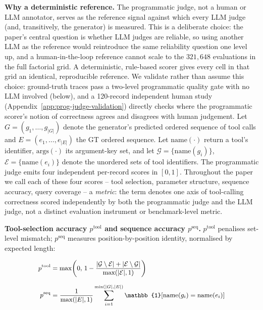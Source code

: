 \noindent\textbf{Why a deterministic reference.} The programmatic judge, not a human or LLM annotator, serves as the reference signal against which every LLM judge (and, transitively, the generator) is measured. This is a deliberate choice: the paper's central question is whether LLM judges are reliable, so using another LLM as the reference would reintroduce the same reliability question one level up, and a human-in-the-loop reference cannot scale to the $321{,}648$ evaluations in the full factorial grid. A deterministic, rule-based scorer gives every cell in that grid an identical, reproducible reference. We validate rather than assume this choice: ground-truth traces pass a two-level programmatic quality gate with no LLM involved (below), and a 120-record independent human study (Appendix~\ref{app:prog-judge-validation}) directly checks where the programmatic scorer's notion of correctness agrees and disagrees with human judgement. Let $G = (g_1, \dots, g_{|G|})$ denote the generator's predicted ordered sequence of tool calls and $E = (e_1, \dots, e_{|E|})$ the GT ordered sequence. Let $\mathrm{name}(\cdot)$ return a tool's identifier, $\mathrm{args}(\cdot)$ its argument-key set, and let $\mathcal{G} = \{\mathrm{name}(g_i)\}$, $\mathcal{E} = \{\mathrm{name}(e_i)\}$ denote the unordered sets of tool identifiers. The programmatic judge emits four independent per-record scores in $[0, 1]$. Throughout the paper we call each of these four scores -- tool selection, parameter structure, sequence accuracy, query coverage -- a \emph{metric}: the term denotes one axis of tool-calling correctness scored independently by both the programmatic judge and the LLM judge, not a distinct evaluation instrument or benchmark-level metric.

\textbf{Tool-selection accuracy $p^{\text{tool}}$ and sequence accuracy $p^{\text{seq}}$.}
$p^{\text{tool}}$ penalises set-level mismatch; $p^{\text{seq}}$ measures position-by-position identity, normalised by expected length:

\vspace{-0.4cm}
\begin{subequations}
\small
\begin{align}
p^{\text{tool}}
&=
\max\!\left(
0,\,
1
-
\frac{
|\mathcal{G} \setminus \mathcal{E}|
+
|\mathcal{E} \setminus \mathcal{G}|
}{
\max(|\mathcal{E}|,1)
}
\right)
\label{eq:prog-tool}
\\[6pt]
p^{\text{seq}}
&=
\frac{1}{\max(|E|,1)}
\sum_{i=1}^{\min(|G|,|E|)}
\mathbb{1}\!\left[
\mathrm{name}(g_i)
=
\mathrm{name}(e_i)
\right]
\label{eq:prog-seq}
\end{align}
\vspace{-0.2cm}
\end{subequations}

